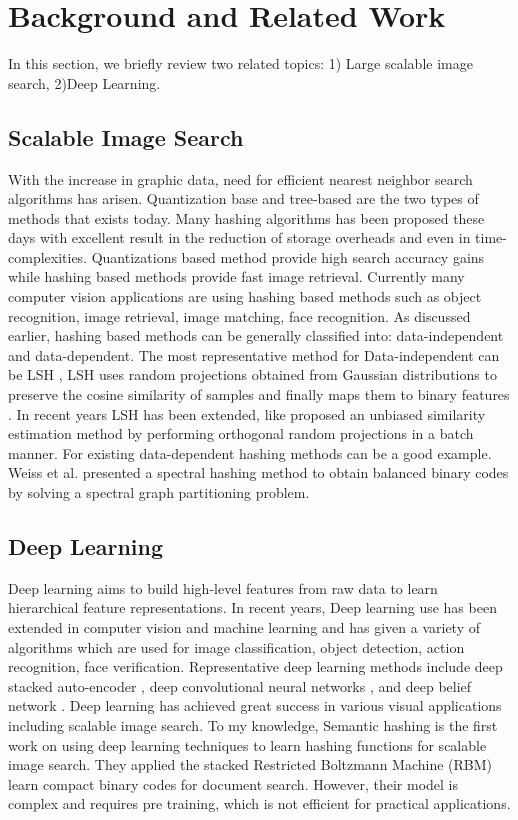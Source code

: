 \chapter{Background and Related Work}
\label{chapter2}
In this section, we briefly review two related topics: 1) Large scalable image search, 2)Deep Learning.
\section{Scalable Image Search}
	With the increase in graphic data, need for efficient nearest neighbor search algorithms has arisen. Quantization base and tree-based are the two types of methods that exists today. Many hashing algorithms has been proposed these days with excellent result in the reduction of storage overheads and even in time-complexities. Quantizations based method provide high search accuracy gains while hashing based methods provide fast image retrieval. Currently many computer vision applications are using hashing based methods such as object recognition, image retrieval, image matching, face recognition. As discussed earlier, hashing based methods can be generally classified into: data-independent and data-dependent. The most representative method for Data-independent can be LSH , LSH uses random projections obtained from Gaussian distributions to preserve the cosine similarity of samples and finally maps them to binary features \cite{andoni2006near}. In recent years LSH has been extended, like  \cite{Ji2012SuperBitLH} proposed an unbiased similarity estimation method by performing orthogonal random projections in a batch manner. For existing data-dependent hashing methods can be a good example. Weiss et al. \cite{890d94598fa54dac85eae9aa824a0a7e} presented a spectral hashing method to obtain balanced binary codes by solving a spectral graph partitioning problem.  

\section{Deep Learning}
	Deep learning aims to build high-level features from raw data to learn hierarchical feature representations. In recent years, Deep learning use has been extended in computer vision and machine learning and has given a variety of algorithms which are used for image classification, object detection, action recognition, face verification. Representative deep  learning methods include deep stacked auto-encoder \cite{Le2011LearningHI}, deep convolutional neural networks \cite{28}, and deep belief network \cite{Hinton504}. Deep learning has achieved great success in various visual applications including scalable image search. To my knowledge, Semantic hashing \cite{Salakhutdinov2009SemanticH} is the first work on using deep learning techniques to learn hashing functions for scalable image search. They applied the stacked Restricted Boltzmann Machine (RBM) learn compact binary codes for document search. However, their model is complex and requires pre training, which is not efficient for practical applications.


